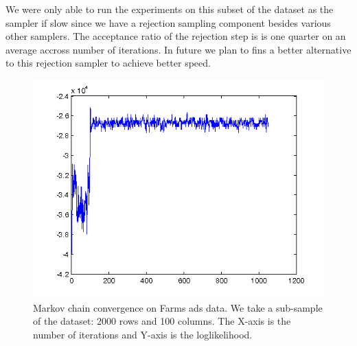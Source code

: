 We were only able to run the experiments on this subset of the dataset as the
sampler if slow since we have a rejection sampling component besides various
other samplers. The acceptance ratio of the rejection step is is one quarter on
an average accross number of iterations. In future we plan to fins a better
alternative to this rejection sampler to achieve better speed. 

\begin{figure}[hbt]
\includegraphics[width=1\textwidth]{samplingConvergence.png}
\caption{Markov chain convergence on Farms ads data. We take a sub-sample of
the dataset: 2000 rows and 100 columns. The X-axis is the number of iterations
and Y-axis is the loglikelihood.}
\label{fig:MCMCconverge}
\end{figure}
